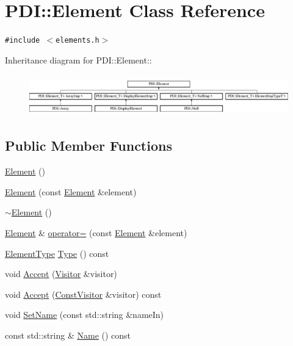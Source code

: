 \hypertarget{class_p_d_i_1_1_element}{
\section{PDI::Element Class Reference}
\label{class_p_d_i_1_1_element}
}
{\tt \#include $<$elements.h$>$}

Inheritance diagram for PDI::Element::\begin{figure}[H]
\begin{center}
\leavevmode
\includegraphics[height=1.80258cm]{class_p_d_i_1_1_element}
\end{center}
\end{figure}
\subsection*{Public Member Functions}
\begin{CompactItemize}
\item 
\hyperlink{class_p_d_i_1_1_element_8bff5e34dcb706745872315786d889fe}{Element} ()
\item 
\hyperlink{class_p_d_i_1_1_element_caebee3e6095bd9bddba580b566ed2c7}{Element} (const \hyperlink{class_p_d_i_1_1_element}{Element} \&element)
\item 
\hyperlink{class_p_d_i_1_1_element_5135cae2be5dda47271fd004bc4a1b4e}{$\sim$Element} ()
\item 
\hyperlink{class_p_d_i_1_1_element}{Element} \& \hyperlink{class_p_d_i_1_1_element_f549e116d18ba2209ea4e9a8b06b5452}{operator=} (const \hyperlink{class_p_d_i_1_1_element}{Element} \&element)
\item 
\hyperlink{namespace_p_d_i_bbd28c6f8905ff6834d6f84ba4363e5e}{ElementType} \hyperlink{class_p_d_i_1_1_element_e5a82dd1ebdd0e3c70f4cf690576984b}{Type} () const 
\item 
void \hyperlink{class_p_d_i_1_1_element_122df676eacaec79f3ca3f9223dfa576}{Accept} (\hyperlink{class_p_d_i_1_1_visitor}{Visitor} \&visitor)
\item 
void \hyperlink{class_p_d_i_1_1_element_f1d0536b08a8c77d066829521097bd2d}{Accept} (\hyperlink{class_p_d_i_1_1_const_visitor}{ConstVisitor} \&visitor) const 
\item 
void \hyperlink{class_p_d_i_1_1_element_dc2054db4dede7a74eee4ec5e981b159}{SetName} (const std::string \&nameIn)
\item 
const std::string \& \hyperlink{class_p_d_i_1_1_element_8d0e2eca3eea1084ea2fe4dce22ee3c8}{Name} () const 
\end{CompactItemize}
